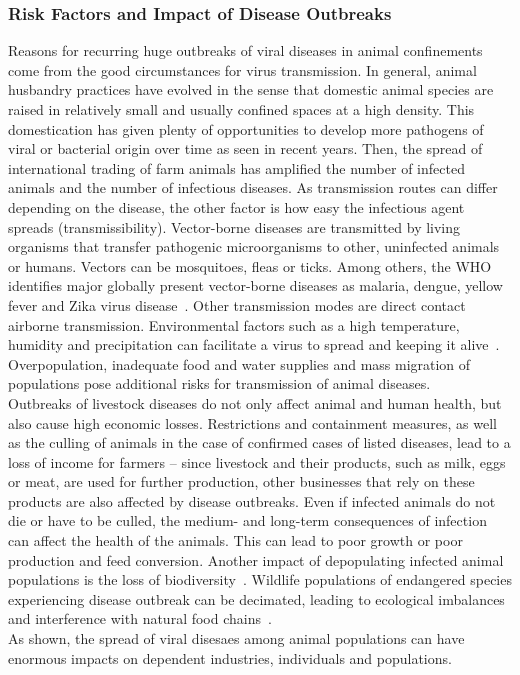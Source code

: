 \subsubsection*{Risk Factors and Impact of Disease Outbreaks}
Reasons for recurring huge outbreaks of viral diseases in animal confinements come from the good circumstances for virus transmission. In general, animal husbandry practices have evolved in the sense that domestic animal species are raised in relatively small and usually confined spaces at a high density. This domestication has given plenty of opportunities to develop more pathogens of viral or bacterial origin over time as seen in recent years. Then, the spread of international trading of farm animals has amplified the number of infected animals and the number of infectious diseases. As transmission routes can differ depending on the disease, the other factor is how easy the infectious agent spreads (transmissibility). Vector-borne diseases are transmitted by living organisms that transfer pathogenic microorganisms to other, uninfected animals or humans. Vectors can be mosquitoes, fleas or ticks. Among others, the WHO identifies major globally present vector-borne diseases as malaria, dengue, yellow fever and Zika virus disease~\cite{world2017global}. Other transmission modes are direct contact airborne transmission. Environmental factors such as a high temperature, humidity and precipitation can facilitate a virus to spread and keeping it alive~\cite{eccles2002explanation}. Overpopulation, inadequate food and water supplies and mass migration of populations pose additional risks for transmission of animal diseases. \\
Outbreaks of livestock diseases do not only affect animal and human health, but also cause high economic losses. Restrictions and containment measures, as well as the culling of animals in the case of confirmed cases of listed diseases, lead to a loss of income for farmers -- since livestock and their products, such as milk, eggs or meat, are used for further production, other businesses that rely on these products are also affected by disease outbreaks. Even if infected animals do not die or have to be culled, the medium- and long-term consequences of infection can affect the health of the animals. This can lead to poor growth or poor production and feed conversion. Another impact of depopulating infected animal populations is the loss of biodiversity~\cite{lacroix2014non, morand2020emerging}. Wildlife populations of endangered species experiencing disease outbreak can be decimated, leading to ecological imbalances and interference with natural food chains~\cite{reid2010global, civitello2015biodiversity, espinosa2020infectious}. \\
As shown, the spread of viral disesaes among animal populations can have enormous impacts on dependent industries, individuals and populations.

